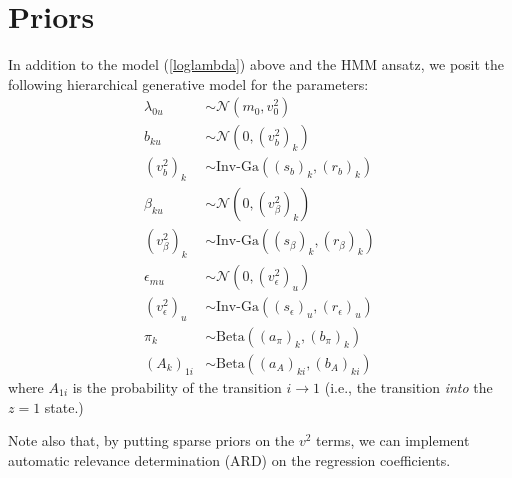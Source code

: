 \documentclass[11pt]{article}
\begin{document}
\section{Priors}
In addition to the model (\ref{loglambda}) above and the HMM ansatz, we posit the following hierarchical generative model for the parameters:
\begin{align}
    \lambda_{0u} &\sim \mathcal{N}(m_0, v^2_0) \\
    b_{ku} &\sim \mathcal{N}\left(0, (v^2_b)_{k}\right) \\
    (v^2_b)_{k} &\sim \text{Inv-Ga}\left((s_b)_k, (r_b)_k \right) \\
    \beta_{ku} &\sim \mathcal{N}\left(0, (v^2_\beta)_{k}\right) \\
    (v^2_\beta)_{k} &\sim \text{Inv-Ga}\left((s_\beta)_k, (r_\beta)_k \right) \\
    \epsilon_{mu} &\sim \mathcal{N}(0, (v^2_\epsilon)_u) \\
    (v^2_\epsilon)_{u} &\sim \text{Inv-Ga}\left((s_\epsilon)_u, (r_\epsilon)_u \right) \\
    \pi_k &\sim \mathrm{Beta}\left((a_\pi)_k, (b_\pi)_k \right) \\ 
    \left(A_k \right)_{1i} &\sim \mathrm{Beta}\left((a_A)_{ki}, (b_A)_{ki} \right)  
    \end{align}
where $A_{1i}$ is the probability of the transition $i \rightarrow 1$ (i.e., the transition \emph{into} the $z = 1$ state.)

Note also that, by putting sparse priors on the $v^2$ terms, we can implement automatic relevance determination (ARD) on the regression coefficients.
\end{document}
